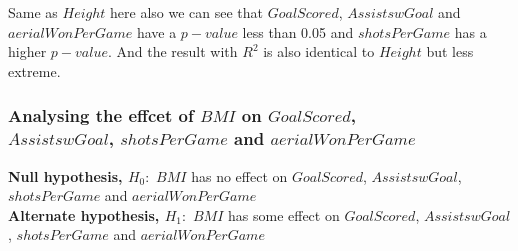 \documentclass[12pt]{article}
\begin{document}
Same as $ Height $ here also we can see that $ GoalScored $, $ AssistswGoal $ and $ aerialWonPerGame $ have a $ p-value $ less than 0.05 and $ shotsPerGame $ has a higher $ p-value $. And the result with $ R^2 $ is also identical to $ Height $ but less extreme.

\newpage

\subsubsection{Analysing the effcet of $ BMI $ on $ GoalScored $, \\ $ AssistswGoal $, $ shotsPerGame $ and $ aerialWonPerGame $}

\textbf{Null hypothesis, $ H_0: $} $ BMI $ has no effect on $ GoalScored $, $ AssistswGoal $, $ shotsPerGame $ and $ aerialWonPerGame $\\
\textbf{Alternate hypothesis, $ H_1: $} $ BMI $ has some effect on $ GoalScored $, $ AssistswGoal $, $ shotsPerGame $ and $ aerialWonPerGame $
\end{document}
